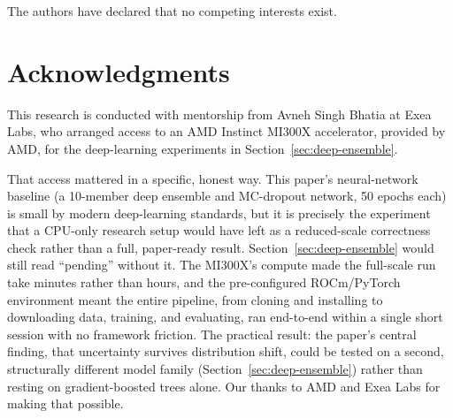 \documentclass[12pt]{article}
\begin{document}
The authors have declared that no competing interests exist.

\section*{Acknowledgments}

This research is conducted with mentorship from Avneh Singh Bhatia at Exea Labs, who arranged access to an AMD Instinct MI300X accelerator, provided by AMD, for the deep-learning experiments in Section~\ref{sec:deep-ensemble}.

That access mattered in a specific, honest way. This paper's neural-network baseline (a 10-member deep ensemble and MC-dropout network, 50 epochs each) is small by modern deep-learning standards, but it is precisely the experiment that a CPU-only research setup would have left as a reduced-scale correctness check rather than a full, paper-ready result. Section~\ref{sec:deep-ensemble} would still read ``pending'' without it. The MI300X's compute made the full-scale run take minutes rather than hours, and the pre-configured ROCm/PyTorch environment meant the entire pipeline, from cloning and installing to downloading data, training, and evaluating, ran end-to-end within a single short session with no framework friction. The practical result: the paper's central finding, that uncertainty survives distribution shift, could be tested on a second, structurally different model family (Section~\ref{sec:deep-ensemble}) rather than resting on gradient-boosted trees alone. Our thanks to AMD and Exea Labs for making that possible.



\end{document}
